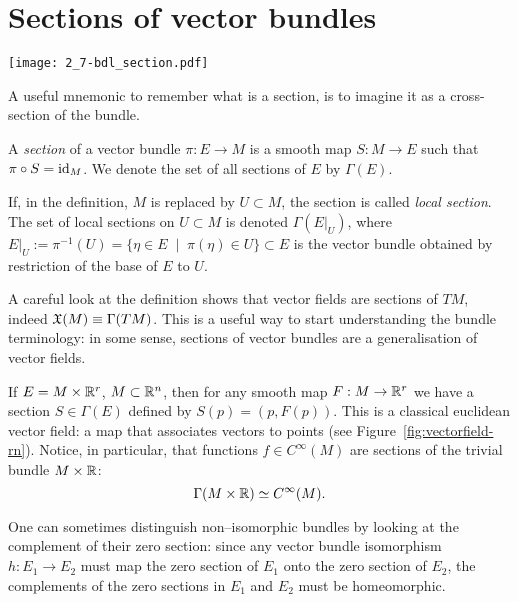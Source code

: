 \section{Sections of vector bundles}

\begin{marginfigure}
  \texttt{[image: 2\_7-bdl\_section.pdf]}
  \caption{A useful mnemonic to remember what is a section, is to imagine it as a cross-section of the bundle.}
\end{marginfigure}

\begin{definition}
  A \emph{section} of a vector bundle $\pi:E \to M$ is a smooth map $S:M \to E$ such that $\pi\circ S = \operatorname{id}_M$. We denote the set of all sections of $E$ by $\Gamma(E)$.

  If, in the definition, $M$ is replaced by $U\subset M$, the section is called \emph{local section}. The set of local sections on $U\subset M$ is denoted $\Gamma(E|_U)$, where $E|_U := \pi^{-1}(U) = \{\eta\in E\;\mid\;\pi(\eta)\in U\} \subset E$ is the vector bundle obtained by restriction of the base of $E$ to $U$.
\end{definition}

\begin{remark}
  A careful look at the definition shows that vector fields are sections of $TM$, indeed $\mathfrak{X}(M) \equiv \Gamma(TM)$.
  This is a useful way to start understanding the bundle terminology: in some sense, sections of vector bundles are a generalisation of vector fields.
\end{remark}

\begin{example}
  If $E = M\times \mathbb{R}^r$, $M\subset\mathbb{R}^n$, then for any smooth map $F: M\to\mathbb{R}^r$ we have a section $S\in\Gamma(E)$ defined by $S(p) = (p, F(p))$. This is a classical euclidean vector field: a map that associates vectors to points (see Figure~\ref{fig:vectorfield-rn}).
  Notice, in particular, that functions $f\in C^\infty(M)$ are sections of the trivial bundle $M\times\mathbb{R}$:
  \begin{equation}
    \Gamma(M\times\mathbb{R}) \simeq C^\infty(M).
  \end{equation}
\end{example}

One can sometimes distinguish non--isomorphic bundles by looking at the complement of their zero section: since any vector bundle isomorphism $h:E_1\to E_2$ must map the zero section of $E_1$ onto the zero section of $E_2$, the complements of the zero sections in $E_1$ and $E_2$ must be homeomorphic.

